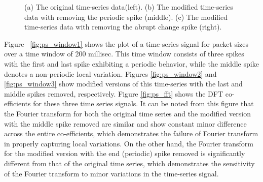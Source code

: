 \documentclass[12pt]{amsart}
\begin{document}







 
 \begin{figure*}[htb]
\centering
{}
\caption{ (a) The original time-series data(left). (b) The modified time-series data with removing the periodic spike (middle). (c) The modified time-series data with removing the abrupt change spike (right). }
\end{figure*}
 
 
Figure ~\ref{fig:ps_window1} shows the plot of a time-series signal for packet sizes over a time window of 200 millisec. This time window consists of three spikes with the first and last spike exhibiting a periodic behavior, while the middle spike denotes a non-periodic local variation. Figures \ref{fig:ps_window2} and \ref{fig:ps_window3} show modified versions of this time-series with the last and middle spikes removed, respectively. Figure \ref{fig:ps_fft} shows the DFT co-efficients for these three time series signals. It can be noted from this figure that the Fourier transform for both the original time series and the modified version with the middle spike removed are similar and show constant minor difference across the entire co-efficients, which demonstrates the failure of Fourier transform in properly capturing local variations. On the other hand, the Fourier transform for the modified version with the end (periodic) spike removed is significantly different from that of the original time series, which demonstrates the sensitivity of the Fourier transform to minor variations in the time-series signal. 
\end{document}
